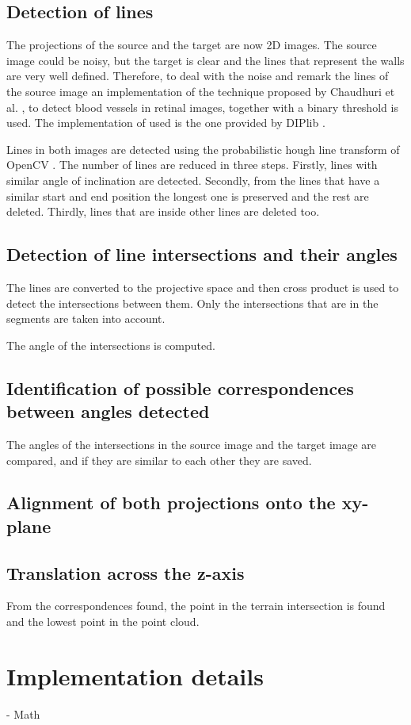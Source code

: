     \subsection{Detection of lines}
        The projections of the source and the target are now 2D images. 
        The source image could be noisy, but the target is clear and the lines that represent the walls are very well defined.
        Therefore, to deal with the noise and remark the lines of the source image an implementation of the technique proposed 
        by Chaudhuri et al. \cite{Chaudhuri_1989_detection}, to detect blood vessels in retinal images, together with a binary threshold is used. 
        The implementation of \cite{Chaudhuri_1989_detection} used is the one provided by DIPlib \cite{DIPlib_online}.

        Lines in both images are detected using the probabilistic hough line transform of OpenCV \cite{opencv_library}.
        The number of lines are reduced in three steps. 
        Firstly, lines with similar angle of inclination are detected.
        Secondly, from the lines that have a similar start and end position the longest one is preserved and the rest are deleted.
        Thirdly, lines that are inside other lines are deleted too.

    \subsection{Detection of line intersections and their angles}
        The lines are converted to the projective space and then cross product is used to detect the intersections between them.
        Only the intersections that are in the segments are taken into account.
        
        The angle of the intersections is computed.

    \subsection{Identification of possible correspondences between angles detected}
        The angles of the intersections in the source image and the target image are compared,
        and if they are similar to each other they are saved.

    \subsection{Alignment of both projections onto the xy-plane}
        

    \subsection{Translation across the z-axis}
        From the correspondences found, the point in the terrain intersection is found and the lowest point in the point cloud.

    \section{Implementation details}
    - Math


